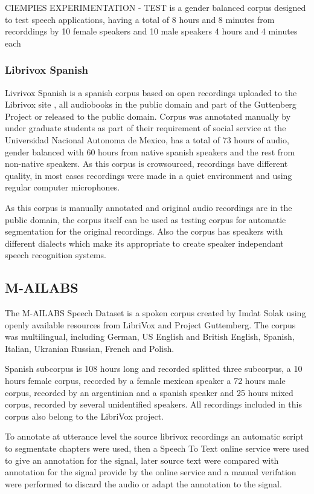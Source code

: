 \documentclass[10pt, a4paper]{article}
\begin{document}
CIEMPIES EXPERIMENTATION - TEST is a gender balanced corpus designed to test speech applications, having a total of 8 hours and 8 minutes from recorddings by 10 female speakers and 10 male speakers 4 hours and 4 minutes each

\subsubsection{Librivox Spanish}

Livrivox Spanish is a spanish corpus based on open recordings uploaded to the Librivox site \cite{LibriVox}, all audiobooks in the public domain and part of the Guttenberg Project \cite{gutenberg} or released to the public domain. Corpus was annotated manually by under graduate students as part of their requirement of social service at the Universidad Nacional Autonoma de Mexico, has a total of 73 hours of audio, gender balanced with 60 hours from native spanish speakers and the rest from non-native speakers. As this corpus is crowsourced, recordings have different quality, in most cases recordings were made in a quiet environment and using regular computer microphones.

As this corpus is manually annotated and original audio recordings are in the public domain, the corpus itself can be used as testing corpus for automatic segmentation for the original recordings. Also the corpus has speakers with different dialects which make its appropriate to create speaker independant speech recognition systems.


\subsection{M-AILABS}

The M-AILABS Speech Dataset is a spoken corpus created by Imdat Solak using openly available resources from LibriVox and Project Guttemberg. The corpus was multilingual, including German, US English and British English, Spanish, Italian, Ukranian Russian, French and Polish.

Spanish subcorpus is 108 hours long and recorded splitted three subcorpus, a 10 hours female corpus, recorded by a female mexican speaker a 72 hours male corpus, recorded by an argentinian and a spanish speaker and  25 hours mixed corpus, recorded by several unidentified speakers. All recordings included in this corpus also belong to the LibriVox project.

To annotate at utterance level the source librivox recordings an automatic script to segmentate chapters were used, then a Speech To Text online service were used to give an annotation for the signal, later source text were compared with annotation for the signal provide by the online service and a manual verifation were performed to discard the audio or adapt the annotation to the signal.
\end{document}
